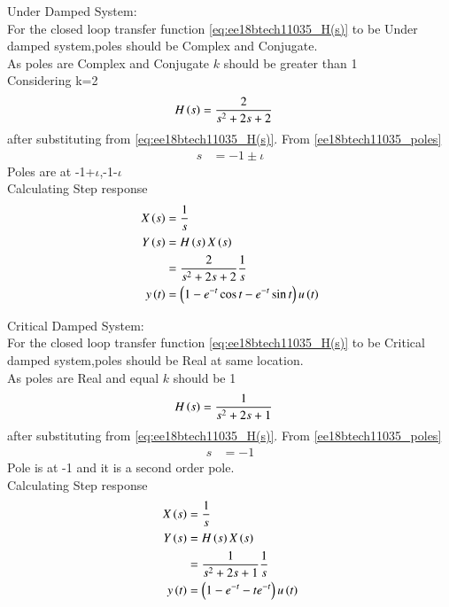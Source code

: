 \begin{enumerate}[label=\thesubsection.\arabic*.,ref=\thesubsection.\theenumi]
Under Damped System:\\
For the closed loop transfer function \eqref{eq:ee18btech11035_H(s)} to be Under damped system,poles should be Complex and Conjugate.\\
As poles are Complex and Conjugate $k$ should be greater than 1\\
Considering k=2\\
\begin{align}
H\left(s\right) &= \frac{2}{s^2+2s+2}
\end{align}
after substituting from \eqref{eq:ee18btech11035_H(s)}.
From \eqref{ee18btech11035_poles}
\begin{align}
s&=-1\pm\iota
\end{align}
Poles are at -1+\(\iota\),-1-\(\iota\)\\
Calculating Step response
\begin{align}
X\left(s\right)&=\frac{1}{s}\\
Y\left(s\right)&=H\left(s\right)X\left(s\right)\\
&=\frac{2}{s^2+2s+2}\frac{1}{s}\\
y\left(t\right)&=\left(1-e^{-t}\cos{t}-e^{-t}\sin{t}\right)u\left(t\right)
\end{align}


Critical Damped System:\\
For the closed loop transfer function \eqref{eq:ee18btech11035_H(s)} to be Critical damped system,poles should be Real at same location.\\
As poles are Real and equal $k$ should be 1\\
\begin{align}
H\left(s\right) &= \frac{1}{s^2+2s+1}
\end{align}
after substituting from \eqref{eq:ee18btech11035_H(s)}.
From \eqref{ee18btech11035_poles}
\begin{align}
s&=-1
\end{align}
Pole is at -1 and it is a second order pole.\\
Calculating Step response
\begin{align}
X\left(s\right)&=\frac{1}{s}\\
Y\left(s\right)&=H\left(s\right)X\left(s\right)\\
&=\frac{1}{s^2+2s+1}\frac{1}{s}\\
y\left(t\right)&=\left(1-e^{-t}-te^{-t}\right)u\left(t\right)
\end{align}


\end{enumerate}
